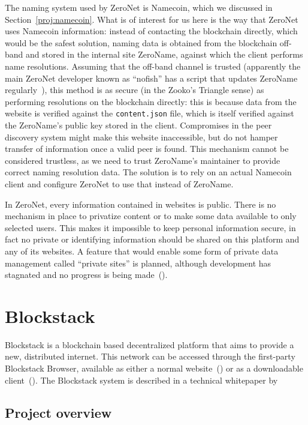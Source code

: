 \documentclass[mscthesis]{usiinfthesis}
\begin{document}
The naming system used by ZeroNet is Namecoin, which we discussed in Section~\ref{proj:namecoin}. What is of interest for us here is the way that ZeroNet uses Namecoin information: instead of contacting the blockchain directly, which would be the safest solution, naming data is obtained from the blockchain off-band and stored in the internal site ZeroName, against which the client performs name resolutions. Assuming that the off-band channel is trusted (apparently the main ZeroNet developer known as ``nofish'' has a script that updates ZeroName regularly~\cite{website:zeronameupdate}), this method is as secure (in the Zooko's Triangle sense) as performing resolutions on the blockchain directly: this is because data from the website is verified against the \texttt{content.json} file, which is itself verified against the ZeroName's public key stored in the client.
Compromises in the peer discovery system might make this website inaccessible, but do not hamper transfer of information once a valid peer is found.
This mechanism cannot be considered trustless, as we need to trust ZeroName's maintainer to provide correct naming resolution data.
The solution is to rely on an actual Namecoin client and configure ZeroNet to use that instead of ZeroName.

In ZeroNet, every information contained in websites is public. There is no mechanism in place to privatize content or to make some data available to only selected users. This makes it impossible to keep personal information secure, in fact no private or identifying information should be shared on this platform and any of its websites. 
A feature that would enable some form of private data management called ``private sites'' is planned, although development has stagnated and no progress is being made~(\cite{website:zeronetprivatesites}).

\section{Blockstack}\label{proj:blockstack}

Blockstack is a blockchain based decentralized platform that aims to provide a new, distributed internet. This network can be accessed through the first-party Blockstack Browser, available as either a normal website~(\cite{website:blockstackbrowser}) or as a downloadable client~(\cite{website:blockstackdownload}). The Blockstack system is described in a technical whitepaper by~\cite{blockstack} %

\subsection{Project overview}
\end{document}
